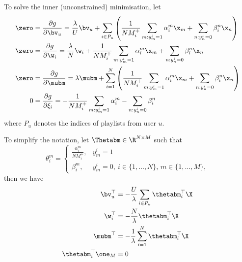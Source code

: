To solve the inner (unconstrained) minimisation, let
\begin{equation*}
\begin{aligned}
\zero &= \frac{\partial g}{\partial \bv_u} 
       = \frac{\lambda}{U} \bv_u 
         + \sum_{i \in P_u} \left( \frac{1}{N M_i^+} \sum_{m: y_m^i = 1} \alpha_i^m \x_m + \sum_{n: y_n^i = 0} \beta_i^n \x_n \right) \\
\zero &= \frac{\partial g}{\partial \w_i}
       = \frac{\lambda}{N} \w_i + \frac{1}{N M_i^+} \sum_{m: y_m^i = 1} \alpha_i^m \x_m + \sum_{n: y_n^i = 0} \beta_i^n \x_n \\
\zero &= \frac{\partial g}{\partial \mubm} 
       = \lambda \mubm + \sum_{i=1}^N \left( \frac{1}{N M_i^+} \sum_{m: y_m^i = 1} \alpha_i^m \x_m + \sum_{n: y_n^i = 0} \beta_i^n \x_n \right) \\
0     &= \frac{\partial g}{\partial \xi_i}
       = - \frac{1}{N M_i^+} \sum_{m: y_m^i = 1} \alpha_i^m - \sum_{n: y_n^i = 0} \beta_i^n \\
\end{aligned}
\end{equation*}
where $P_u$ denotes the indices of playlists from user $u$.

To simplify the notation, let $\Thetabm \in \R^{N \times M}$ such that
\begin{equation*}
\theta_i^m = 
\begin{cases}
    \frac{\alpha_i^m}{N M_i^+}, & y_m^i = 1 \\
    \beta_i^m, & y_m^i = 0, \ i \in \{1,\dots,N\}, \, m \in \{1,\dots,M\},
\end{cases}
\end{equation*}
then we have
\begin{equation*}
\begin{aligned}
\bv_u^\top &= -\frac{U}{\lambda} \sum_{i \in P_u} \thetabm_i^\top \X \\
\w_i^\top  &= -\frac{N}{\lambda} \thetabm_i^\top \X \\
\mubm^\top &= -\frac{1}{\lambda} \sum_{i=1}^N \thetabm_i^\top \X \\
\thetabm_i^\top \one_M &= 0
\end{aligned}
\end{equation*}

